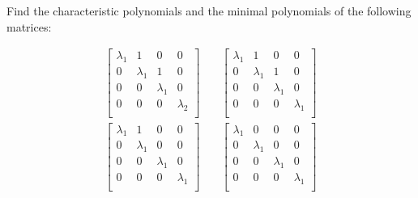 \item[3.18] Find the characteristic polynomials and the minimal polynomials of the following matrices:

\begin{align*}
 \begin{bmatrix}
  \lambda_1 & 1 & 0 & 0\\
  0 &\lambda_1 & 1 & 0 \\
   0 & 0& \lambda_1  & 0\\
  0 & 0 & 0 &\lambda_2 \\
 \end{bmatrix}
& \quad
\begin{bmatrix}
  \lambda_1 & 1 & 0 & 0\\
  0 &\lambda_1 & 1 & 0 \\
   0 & 0& \lambda_1  & 0\\
  0 & 0 & 0 &\lambda_1 \\
 \end{bmatrix}
\\
\begin{bmatrix}
  \lambda_1 & 1 & 0 & 0\\
  0 &\lambda_1 & 0 & 0 \\
   0 & 0& \lambda_1  & 0\\
  0 & 0 & 0 &\lambda_1 \\
 \end{bmatrix}
& \quad
\begin{bmatrix}
  \lambda_1 & 0 & 0 & 0\\
  0 &\lambda_1 & 0 & 0 \\
   0 & 0& \lambda_1  & 0\\
  0 & 0 & 0 &\lambda_1 \\
 \end{bmatrix}
\end{align*}
